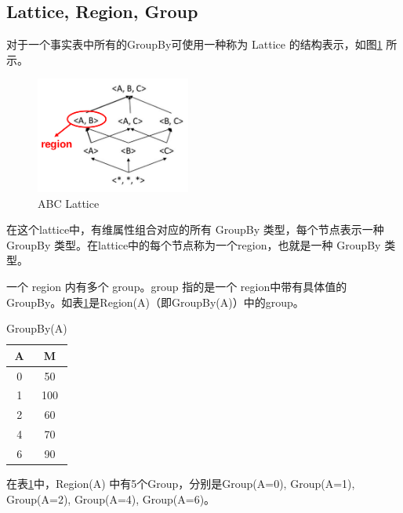 \subsection{Lattice, Region, Group}


对于一个事实表中所有的GroupBy可使用一种称为 Lattice 的结构表示，如图\ref{abc_lattice} 所示。

\begin{figure}[!htb]
\centering\includegraphics[width=2in]{picture/ch_preliminary/abc_lattice} 
\caption{ABC Lattice}\label{abc_lattice} 
\end{figure} 

在这个lattice中，有维属性组合对应的所有 GroupBy 类型，每个节点表示一种 GroupBy 类型。在lattice中的每个节点称为一个region，也就是一种 GroupBy 类型。

一个 region 内有多个 group。group 指的是一个
region中带有具体值的 GroupBy。如表\ref{groupby_a_table}是Region(A)（即GroupBy(A)）中的group。

\begin{table}[!ht]
\begin{center}
\begin{tabular}{|c|c|}
\hline 
A & M \\ 
\hline 
0 & 50 \\ 
\hline 
1 & 100 \\ 
\hline 
2 & 60 \\ 
\hline 
4 & 70 \\ 
\hline 
6 & 90 \\ 
\hline 
\end{tabular} 
\end{center}
\caption{GroupBy(A)}\label{groupby_a_table}
\end{table}

在表\ref{groupby_a_table}中，Region(A) 中有5个Group，分别是Group(A=0), Group(A=1), Group(A=2), Group(A=4), Group(A=6)。

